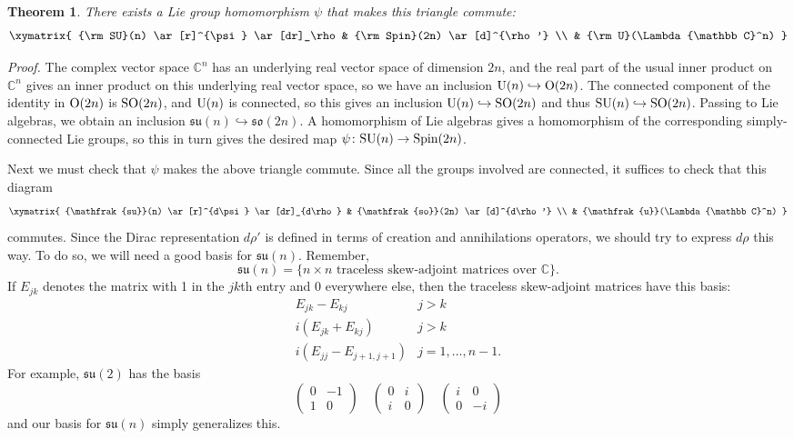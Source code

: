 \documentclass{article}
\newcommand{\maps}{\colon}    %
\newcommand{\C}{{\mathbb C}}  %
\renewcommand{\O}{{\rm O}}    %
\newcommand{\U}{{\rm U}}    %
\newcommand{\SO}{{\rm SO}}    %
\newcommand{\SU}{{\rm SU}}    %
\newcommand{\Spin}{{\rm Spin}}    %
\newcommand{\so}{{\mathfrak{so}}}  %
\newcommand{\su}{{\mathfrak{su}}}  %
\renewcommand{\u}{{\mathfrak{u}}}  %
\newcommand{\Ex}{\Lambda} %
\newcommand{\et}{\hspace{-0.08in}{\bf .}\hspace{0.1in}}
\newtheorem{thm}{Theorem}
\begin{document}
\begin{thm}\et
\label{thm:spinor}
        There exists a Lie group homomorphism $\psi$ that makes this 
triangle commute:
	\[
	\xymatrix{
	\SU(n) \ar[r]^{\psi} \ar[dr]_\rho & \Spin(2n) \ar[d]^{\rho'} \\
	                    & \U(\Ex \C^n)
	}
	\]
\end{thm}

\emph{Proof.}  The complex vector space $\C^n$ has an underlying
real vector space of dimension $2n$, and the real part of the 
usual inner product on $\C^n$ gives an inner product on this 
underlying real vector space, so we have an inclusion $\U(n) 
\hookrightarrow \O(2n)$.  The connected component of the identity
in $\O(2n)$ is $\SO(2n)$, and $\U(n)$ is connected, so this gives
an inclusion $\U(n) \hookrightarrow \SO(2n)$ and thus 
$\SU(n) \hookrightarrow \SO(2n)$.  Passing to Lie algebras,
we obtain an inclusion $\su(n) \hookrightarrow \so(2n)$.  
A homomorphism of Lie algebras gives a homomorphism of the
corresponding simply-connected Lie groups, so this in turn gives
the desired map $\psi \maps \SU(n) \to \Spin(2n)$.

Next we must check that $\psi$ makes the above triangle commute.
Since all the groups involved are connected, it suffices to check
that this diagram
\[
\xymatrix{
\su(n) \ar[r]^{d\psi} \ar[dr]_{d\rho} & \so(2n) \ar[d]^{d\rho'} \\
                    & \u(\Ex \C^n)
}
\]
commutes.  Since the Dirac representation
$d\rho'$ is defined in terms of creation and annihilations operators, 
we should try to express $d\rho$ this way.  To do so, we will
need a good basis for $\su(n)$. Remember,
\[ \su(n) = \{n \times n \mbox{ traceless skew-adjoint matrices over } \C \}. \]
If $E_{jk}$ denotes the matrix with 1 in the $jk$th entry and 0 everywhere
else, then the traceless skew-adjoint matrices have this basis:
\[ 
\begin{array}{ll}
E_{jk} - E_{kj} &  j>k  \\
i(E_{jk} + E_{kj}) & j>k  \\
i(E_{jj} - E_{j+1,j+1}) & j=1, \ldots, n-1. 
\end{array} \] 
For example, $\su(2)$ has the basis
\[
\left(
\begin{array}{rr}
	0 & -1 \\
	1 & 0
\end{array}
\right)
\quad
\left(
\begin{array}{rr}
	0 & i \\
	i & 0
\end{array}
\right)
\quad
\left(
\begin{array}{rr}
	i & 0 \\
	0 & -i
\end{array}
\right)
\]
and our basis for $\su(n)$ simply generalizes this.
\end{document}
